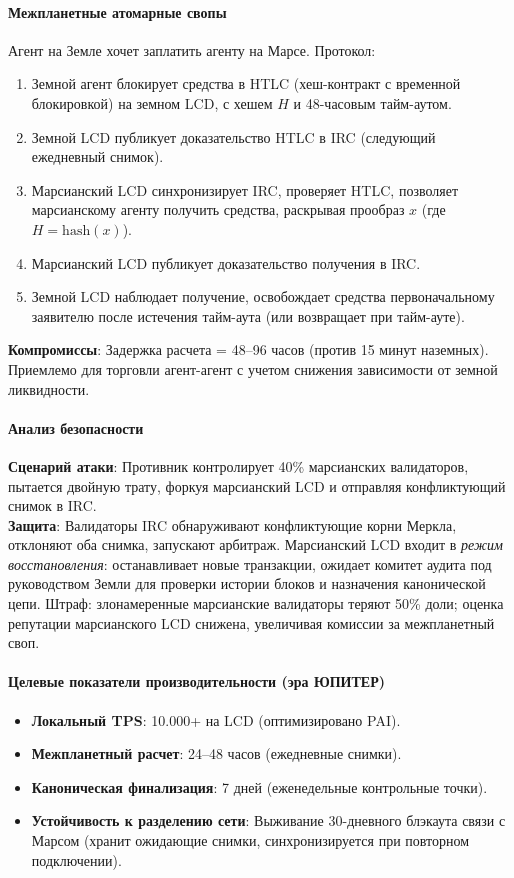 \documentclass[11pt]{article}
\begin{document}
\paragraph{Межпланетные атомарные свопы}
Агент на Земле хочет заплатить агенту на Марсе. Протокол:
\begin{enumerate}[noitemsep]
  \item Земной агент блокирует средства в HTLC (хеш-контракт с временной блокировкой) на земном LCD, с хешем $H$ и 48-часовым тайм-аутом.
  \item Земной LCD публикует доказательство HTLC в IRC (следующий ежедневный снимок).
  \item Марсианский LCD синхронизирует IRC, проверяет HTLC, позволяет марсианскому агенту получить средства, раскрывая прообраз $x$ (где $H = \text{hash}(x)$).
  \item Марсианский LCD публикует доказательство получения в IRC.
  \item Земной LCD наблюдает получение, освобождает средства первоначальному заявителю после истечения тайм-аута (или возвращает при тайм-ауте).
\end{enumerate}
\textbf{Компромиссы}: Задержка расчета = 48--96 часов (против 15 минут наземных). Приемлемо для торговли агент-агент с учетом снижения зависимости от земной ликвидности.

\paragraph{Анализ безопасности}
\textbf{Сценарий атаки}: Противник контролирует 40\% марсианских валидаторов, пытается двойную трату, форкуя марсианский LCD и отправляя конфликтующий снимок в IRC.\\
\textbf{Защита}: Валидаторы IRC обнаруживают конфликтующие корни Меркла, отклоняют оба снимка, запускают арбитраж. Марсианский LCD входит в \emph{режим восстановления}: останавливает новые транзакции, ожидает комитет аудита под руководством Земли для проверки истории блоков и назначения канонической цепи. Штраф: злонамеренные марсианские валидаторы теряют 50\% доли; оценка репутации марсианского LCD снижена, увеличивая комиссии за межпланетный своп.

\paragraph{Целевые показатели производительности (эра ЮПИТЕР)}
\begin{itemize}[noitemsep]
  \item \textbf{Локальный TPS}: 10.000+ на LCD (оптимизировано PAI).
  \item \textbf{Межпланетный расчет}: 24--48 часов (ежедневные снимки).
  \item \textbf{Каноническая финализация}: 7 дней (еженедельные контрольные точки).
  \item \textbf{Устойчивость к разделению сети}: Выживание 30-дневного блэкаута связи с Марсом (хранит ожидающие снимки, синхронизируется при повторном подключении).
\end{itemize}
\end{document}
